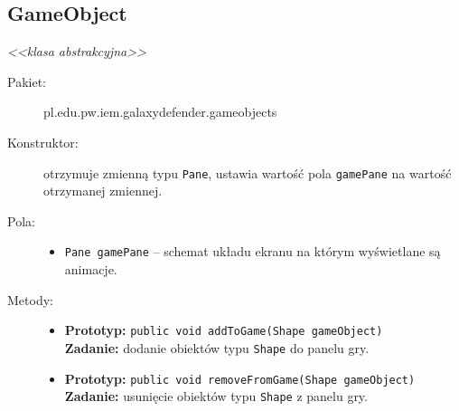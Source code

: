 \documentclass[a4paper]{article}
\newcommand{\prog}{\texttt}
\begin{document}
\subsection{GameObject}
\textit{<<klasa abstrakcyjna>>}
\begin{description}
    \item[Pakiet:] pl.edu.pw.iem.galaxydefender.gameobjects
    \item[Konstruktor:] otrzymuje zmienną typu \prog{Pane}, ustawia wartość pola \prog{gamePane} na wartość otrzymanej zmiennej.
    \item[Pola:] \hfill
    \begin{itemize}
        \item \prog{Pane gamePane} -- schemat układu ekranu na którym wyświetlane są animacje.
    \end{itemize}
    \item[Metody:] \hfill
    \begin{itemize}
        \item \textbf{Prototyp:} \prog{public void addToGame(Shape gameObject)}\\\textbf{Zadanie:} dodanie obiektów typu \prog{Shape} do panelu gry.
        \item \textbf{Prototyp:} \prog{public void removeFromGame(Shape gameObject)}\\\textbf{Zadanie:} usunięcie obiektów typu \prog{Shape} z panelu gry.
    \end{itemize}
\end{description}
\end{document}

